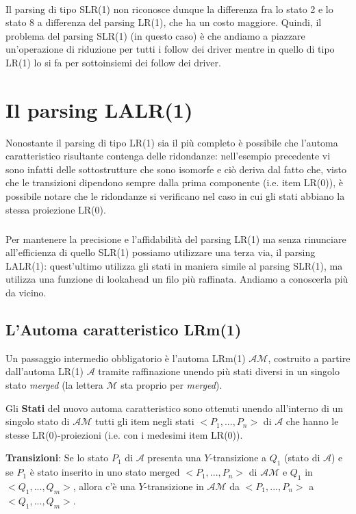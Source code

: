 \documentclass[class=book, crop=false, oneside, 12pt]{standalone}
\begin{document}
\paragraph*{}
Il parsing di tipo SLR(1) non riconosce dunque la differenza fra lo stato 2 e lo stato 8 a differenza del parsing LR(1), che ha un costo maggiore. Quindi, il problema del parsing SLR(1) (in questo caso) è che andiamo a piazzare un'operazione di riduzione per tutti i follow dei driver mentre in quello di tipo LR(1) lo si fa per sottoinsiemi dei follow dei driver.

\section{Il parsing LALR(1)}
Nonostante il parsing di tipo LR(1) sia il più completo è possibile che l'automa caratteristico risultante contenga delle ridondanze: nell'esempio precedente vi sono infatti delle sottostrutture che sono isomorfe e ciò deriva dal fatto che, visto che le transizioni dipendono sempre dalla prima componente (i.e. item LR(0)), è possibile notare che le ridondanze si verificano nel caso in cui gli stati abbiano la stessa proiezione LR(0).
\subparagraph*{}
Per mantenere la precisione e l'affidabilità del parsing LR(1) ma senza rinunciare all'efficienza di quello SLR(1) possiamo utilizzare una terza via, il parsing LALR(1): quest'ultimo utilizza gli stati in maniera simile al parsing SLR(1), ma utilizza una funzione di lookahead un filo più raffinata. Andiamo a conoscerla più da vicino.

\subsection{L'Automa caratteristico LRm(1)}

Un passaggio intermedio obbligatorio è l'automa LRm(1) \(\mathcal{AM}\), costruito a partire dall'automa LR(1) \(\mathcal{A}\) tramite raffinazione unendo più stati diversi in un singolo stato \emph{merged} (la lettera \(\mathcal{M}\) sta proprio per \emph{merged}).

Gli \textbf{Stati} del nuovo automa caratteristico sono ottenuti unendo all'interno di un singolo stato di \(\mathcal{AM}\) tutti gli item negli stati \(<P_1, ..., P_n>\) di \(\mathcal{A}\) che hanno le stesse LR(0)-proiezioni (i.e. con i medesimi item LR(0)).

\textbf{Transizioni}: Se lo stato \(P_1\) di \(\mathcal{A}\) presenta una \(Y\)-transizione a \(Q_1\) (stato di \(\mathcal{A}\)) e se \(P_1\) è stato inserito in uno stato merged \(<P_1, ..., P_n>\) di \(\mathcal{AM}\) e \(Q_1\) in \(<Q_1, ..., Q_m>\), allora c'è una \(Y\)-transizione in \(\mathcal{AM}\) da \(<P_1, ..., P_n>\) a \(<Q_1, ..., Q_m>\).
\end{document}
